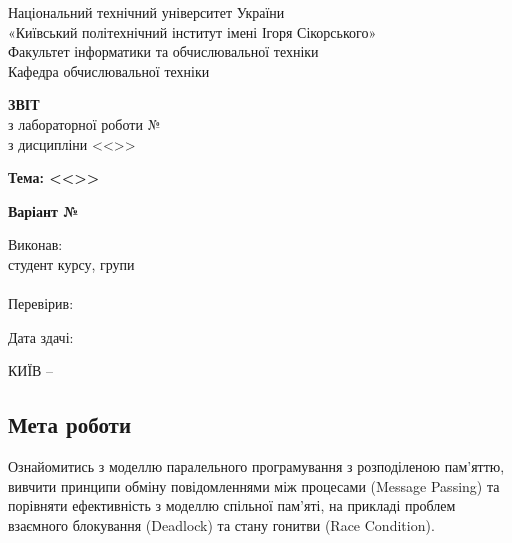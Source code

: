 \documentclass[14pt, a4paper]{extreport}
\begin{document}
	
	\begin{titlepage}
		\begin{center}
			\normalsize
			Національний технічний університет України\\
			«Київський політехнічний інститут імені Ігоря Сікорського» \\[0.5em]
			Факультет інформатики та обчислювальної техніки\\
			Кафедра обчислювальної техніки
			
			\vfill
			
			{\large \textbf{ЗВІТ}\\[0.5em]}
			{з лабораторної роботи №\LabNumber \\}
			{з дисципліни <<\CourseTitle>>}
			
			\vspace{2em}
			
			{\textbf{Тема: <<\Topic>>}}
			
			\vspace{1em}
			
			{\textbf{Варіант №\Variant}}
			
			\vfill
			
			\begin{flushright}
				Виконав: \\ студент \CourseNumber{} курсу, групи \StudentGroup \\
				\StudentName \\[1em]
				Перевірив: \\ \Teacher
			\end{flushright}
			
			\vfill
			
			\begin{flushright}
				Дата здачі: \DTMtoday
			\end{flushright}
			
			\vspace{5em}
			КИЇВ -- \ReportYear
		\end{center}
	\end{titlepage}
	
	\clearpage
	\setcounter{page}{2}
	
	\subsection*{Мета роботи} 
	Ознайомитись з моделлю паралельного програмування з розподіленою пам'яттю, вивчити принципи обміну повідомленнями між процесами (Message Passing) та порівняти ефективність з моделлю спільної пам'яті, на прикладі проблем взаємного блокування (Deadlock) та стану гонитви (Race Condition).
	
\end{document}
